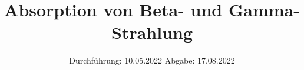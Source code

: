 

\subject{V704}
\title{Absorption von Beta- und Gamma-Strahlung}
\date{
  Durchführung: 10.05.2022
  \hspace{3em}
  Abgabe: 17.08.2022
}



\maketitle
\thispagestyle{empty}
\tableofcontents
\newpage








\newpage
\printbibliography{}
\nocite{matplotlib}
\nocite{numpy}
\nocite{scipy}
\nocite{uncertainties}
\nocite{reback2020pandas}


